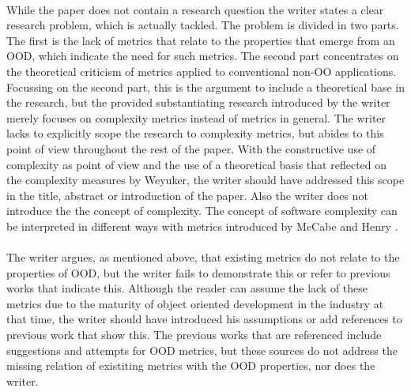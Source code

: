 \paragraph{}
While the paper does not contain a research question the writer states a clear research problem, which is actually tackled.
The problem is divided in two parts. The first is the lack of metrics that relate to the properties that emerge from an
OOD, which indicate the need for such metrics. The second part concentrates on the theoretical criticism of metrics
applied to conventional non-OO applications. Focussing on the second part, this is the argument to include a theoretical base in the
research, but the provided substantiating research introduced by the writer merely focuses on complexity metrics instead
of metrics in general. The writer lacks to explicitly scope the research to complexity metrics, but abides to this
point of view throughout the rest of the paper. With the constructive use of complexity as point of view and the use of
a theoretical basis that reflected on the complexity measures by Weyuker, the writer should have addressed this scope in
the title, abstract or introduction of the paper. Also the writer does not introduce the the concept of complexity. The concept of
software complexity can be interpreted in different ways with metrics introduced by McCabe \autocite{ICSE-1976-McCabe}
and Henry \autocite{HENRY}.

\paragraph{}
The writer argues, as mentioned above, that existing metrics do not relate to the properties of OOD, but the writer fails
to demonstrate this or refer to previous works that indicate this. Although the reader can assume the lack of these
metrics due to the maturity of object oriented development in the industry at that time, the writer should have introduced
his assumptions or add references to previous work that show this. The previous works that are referenced include suggestions
and attempts for OOD metrics, but these sources do not address the missing relation of existiting metrics with the OOD
properties, nor does the writer.

